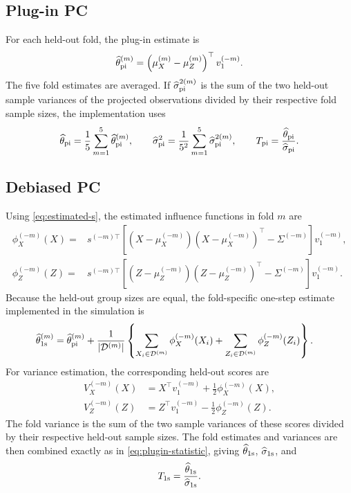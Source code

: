 \documentclass[11pt]{article}
\begin{document}
\subsection{Plug-in PC}

For each held-out fold, the plug-in estimate is
\begin{equation}
\widehat\theta_{\rm pi}^{(m)}
=
\left(\mu_X^{(m)}-\mu_Z^{(m)}\right)^\top v_1^{(-m)}.
\label{eq:plugin-fold-estimate}
\end{equation}
The five fold estimates are averaged. If
$\widehat\sigma_{\rm pi}^{2(m)}$ is the sum of the two held-out sample
variances of the projected observations divided by their respective fold
sample sizes, the implementation uses
\begin{equation}
\widehat\theta_{\rm pi}
=\frac{1}{5}\sum_{m=1}^5\widehat\theta_{\rm pi}^{(m)},
\qquad
\widehat\sigma_{\rm pi}^2
=\frac{1}{5^2}\sum_{m=1}^5
\widehat\sigma_{\rm pi}^{2(m)},
\qquad
T_{\rm pi}=\frac{\widehat\theta_{\rm pi}}
{\widehat\sigma_{\rm pi}}.
\label{eq:plugin-statistic}
\end{equation}

\subsection{Debiased PC}

Using \eqref{eq:estimated-s}, the estimated influence functions in fold $m$
are
\begin{align}
\phi_X^{(-m)}(X)
={}&s^{(-m)\top}
\left[
\left(X-\mu_X^{(-m)}\right)
\left(X-\mu_X^{(-m)}\right)^\top
-\Sigma^{(-m)}
\right]v_1^{(-m)},
\label{eq:x-influence-function}\\
\phi_Z^{(-m)}(Z)
={}&s^{(-m)\top}
\left[
\left(Z-\mu_Z^{(-m)}\right)
\left(Z-\mu_Z^{(-m)}\right)^\top
-\Sigma^{(-m)}
\right]v_1^{(-m)}.
\label{eq:z-influence-function}
\end{align}
Because the held-out group sizes are equal, the fold-specific one-step
estimate implemented in the simulation is
\begin{align}
\widehat\theta_{\rm 1s}^{(m)}
={}&\widehat\theta_{\rm pi}^{(m)}
+\frac{1}{|\mathcal D^{(m)}|}
\left\{
\sum_{X_i\in\mathcal D^{(m)}}\phi_X^{(-m)}(X_i)
+\sum_{Z_i\in\mathcal D^{(m)}}\phi_Z^{(-m)}(Z_i)
\right\}.
\label{eq:debiased-fold-estimate}
\end{align}
For variance estimation, the corresponding held-out scores are
\begin{align*}
V_X^{(-m)}(X)
&=X^\top v_1^{(-m)}+\frac{1}{2}\phi_X^{(-m)}(X),\\
V_Z^{(-m)}(Z)
&=Z^\top v_1^{(-m)}-\frac{1}{2}\phi_Z^{(-m)}(Z).
\end{align*}
The fold variance is the sum of the two sample variances of these scores
divided by their respective held-out sample sizes. The fold estimates and
variances are then combined exactly as in \eqref{eq:plugin-statistic}, giving
$\widehat\theta_{\rm 1s}$, $\widehat\sigma_{\rm 1s}$, and
\[
T_{\rm 1s}=\frac{\widehat\theta_{\rm 1s}}
{\widehat\sigma_{\rm 1s}}.
\]
\end{document}
